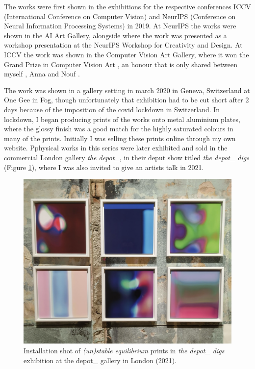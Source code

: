 The works were first shown in the exhibitions for the respective conferences ICCV (International Conference on Computer Vision) and NeurIPS (Conference on Neural Information Processing Systems) in 2019. 
At NeurIPS the works were shown in the AI Art Gallery, alongside where the work was presented as a workshop presentation at the NeurIPS Workshop for Creativity and Design. 
At ICCV the work was shown in the Computer Vision Art Gallery, where it won the Grand Prize in Computer Vision Art , an honour that is only shared between myself \citep{broad2019unstable}, Anna \citet{ridler2018mosaic} and Nouf \citet{aljowaysir2021salaf}.

The work was shown in a gallery setting in march 2020 in Geneva, Switzerland at One Gee in Fog, though unfortunately that exhibition had to be cut short after 2 days because of the imposition of the covid lockdown in Switzerland. 
In lockdown, I began producing prints of the works onto metal aluminium plates, where the glossy finish was a good match for the highly saturated colours in many of the prints. 
Initially I was selling these prints online through my own website. Pphysical works in this series were later exhibited and sold in the commercial London gallery \textit{the depot\_}, in their deput show titled \textit{the depot\_ digs} \citep{depot2021digs} (Figure \ref{fig:c7:depot_digs}), where I was also invited to give an artists talk in 2021.

\begin{figure}[!htb]
    \centering
    \captionsetup{justification=centering}
    \includegraphics[width=1\textwidth]{figures/c7_impact/depot_cropped.png}
    \caption[Installation shot of \textit{(un)stable equilibrium} in the depot\_ gallery]{Installation shot of \textit{(un)stable equilibrium} prints in \textit{the depot\_ digs} exhibition at the depot\_ gallery in London (2021).}
    \label{fig:c7:depot_digs}
\end{figure}


